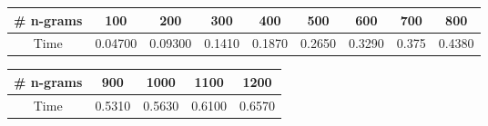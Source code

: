 \begin{tabular}{|c|c|c|c|c|c|c|c|c|}
\hline 
\# n-grams & 100& 200& 300& 400& 500& 600& 700& 800\\ 
\hline 
Time& 0.04700& 0.09300& 0.1410& 0.1870& 0.2650& 0.3290& 0.375& 0.4380\\ 
\hline 
\end{tabular}
 
\begin{tabular}{|c|c|c|c|c|}
\hline 
\# n-grams & 900& 1000& 1100& 1200\\ 
\hline 
Time& 0.5310& 0.5630& 0.6100& 0.6570\\ 
\hline 
\end{tabular}
